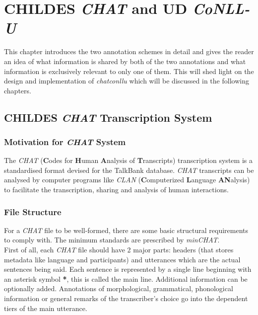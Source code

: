 \chapter{CHILDES \emph{CHAT} and UD \emph{CoNLL-U}} %

\label{Chapter2} %

This chapter introduces the two annotation schemes in detail and gives the
reader an idea of what information is shared by both of the two annotations and
what information is exclusively relevant to only one of them. This will shed
light on the design and implementation of \emph{chatconllu} which will be
discussed in the following chapters.

\section{CHILDES \emph{CHAT} Transcription System}
\subsection{Motivation for \emph{CHAT} System}
The \emph{CHAT} (\textbf{C}odes for \textbf{H}uman \textbf{A}nalysis of
\textbf{T}ranscripts) transcription system \cite{Macwhinney2000} is a
standardised format devised for the TalkBank database. \emph{CHAT} transcripts
can be analysed by computer programs like \emph{CLAN} (\textbf{C}omputerized
\textbf{L}anguage \textbf{AN}alysis) to facilitate the transcription, sharing
and analysis of human interactions.

\subsection{File Structure}
For a \emph{CHAT} file to be well-formed, there are some basic structural
requirements to comply with. The minimum standards are prescribed by
\emph{minCHAT}.\\
First of all, each \emph{CHAT} file should have 2 major parts: headers (that
stores metadata like language and participants) and utterances which are the
actual sentences being said. Each sentence is represented by a single line
beginning with an asterisk symbol \textbf{*}, this is called the main line.
Additional information can be optionally added. Annotations of morphological,
grammatical, phonological information or general remarks of the transcriber's
choice go into the dependent tiers of the main utterance.
